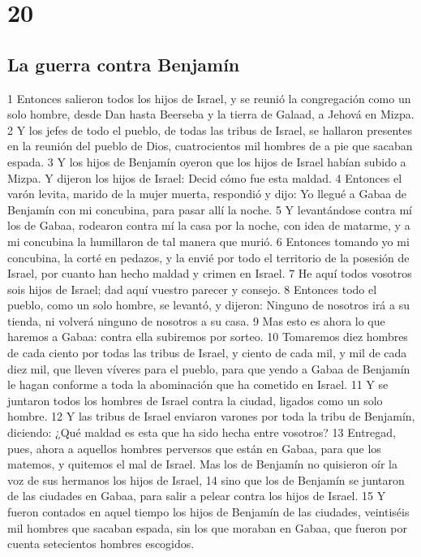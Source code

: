 \chapter{20}

\section*{La guerra contra Benjamín}


1 Entonces salieron todos los hijos de Israel, y se reunió la congregación como un solo hombre, desde Dan hasta Beerseba y la tierra de Galaad, a Jehová en Mizpa.
2 Y los jefes de todo el pueblo, de todas las tribus de Israel, se hallaron presentes en la reunión del pueblo de Dios, cuatrocientos mil hombres de a pie que sacaban espada.
3 Y los hijos de Benjamín oyeron que los hijos de Israel habían subido a Mizpa. Y dijeron los hijos de Israel: Decid cómo fue esta maldad.
4 Entonces el varón levita, marido de la mujer muerta, respondió y dijo: Yo llegué a Gabaa de Benjamín con mi concubina, para pasar allí la noche.
5 Y levantándose contra mí los de Gabaa, rodearon contra mí la casa por la noche, con idea de matarme, y a mi concubina la humillaron de tal manera que murió.
6 Entonces tomando yo mi concubina, la corté en pedazos, y la envié por todo el territorio de la posesión de Israel, por cuanto han hecho maldad y crimen en Israel.
7 He aquí todos vosotros sois hijos de Israel; dad aquí vuestro parecer y consejo.
8 Entonces todo el pueblo, como un solo hombre, se levantó, y dijeron: Ninguno de nosotros irá a su tienda, ni volverá ninguno de nosotros a su casa.
9 Mas esto es ahora lo que haremos a Gabaa: contra ella subiremos por sorteo.
10 Tomaremos diez hombres de cada ciento por todas las tribus de Israel, y ciento de cada mil, y mil de cada diez mil, que lleven víveres para el pueblo, para que yendo a Gabaa de Benjamín le hagan conforme a toda la abominación que ha cometido en Israel.
11 Y se juntaron todos los hombres de Israel contra la ciudad, ligados como un solo hombre.
12 Y las tribus de Israel enviaron varones por toda la tribu de Benjamín, diciendo: ¿Qué maldad es esta que ha sido hecha entre vosotros?
13 Entregad, pues, ahora a aquellos hombres perversos que están en Gabaa, para que los matemos, y quitemos el mal de Israel. Mas los de Benjamín no quisieron oír la voz de sus hermanos los hijos de Israel,
14 sino que los de Benjamín se juntaron de las ciudades en Gabaa, para salir a pelear contra los hijos de Israel.
15 Y fueron contados en aquel tiempo los hijos de Benjamín de las ciudades, veintiséis mil hombres que sacaban espada, sin los que moraban en Gabaa, que fueron por cuenta setecientos hombres escogidos.

